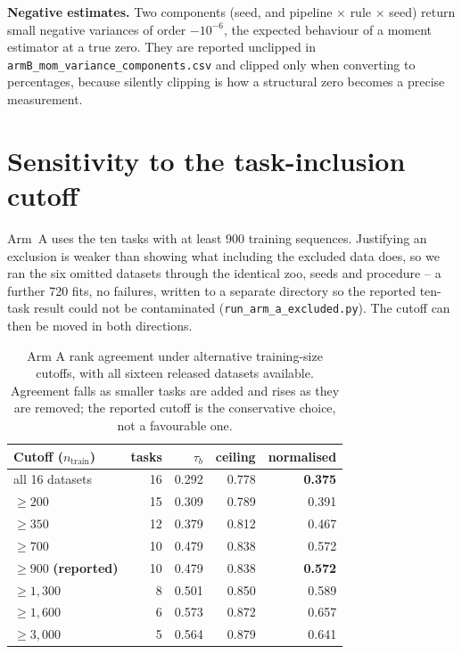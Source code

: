 \documentclass[11pt,a4paper]{article}
\begin{document}
\textbf{Negative estimates.} Two components (seed, and pipeline $\times$ rule $\times$ seed)
return small negative variances of order $-10^{-6}$, the expected behaviour of a moment
estimator at a true zero. They are reported unclipped in
\texttt{armB\_mom\_variance\_components.csv} and clipped only when converting to
percentages, because silently clipping is how a structural zero becomes a precise
measurement.

\section{Sensitivity to the task-inclusion cutoff}
\label{sec:cutoff}

Arm~A uses the ten tasks with at least 900 training sequences. Justifying an exclusion is
weaker than showing what including the excluded data does, so we ran the six omitted
datasets through the identical zoo, seeds and procedure -- a further 720 fits, no failures,
written to a separate directory so the reported ten-task result could not be contaminated
(\texttt{run\_arm\_a\_excluded.py}). The cutoff can then be moved in both directions.

\begin{table}[htbp]\centering\small
\caption{Arm A rank agreement under alternative training-size cutoffs, with all sixteen
released datasets available. Agreement falls as smaller tasks are added and rises as they
are removed; the reported cutoff is the conservative choice, not a favourable one.}
\label{tab:cutoff}
\begin{tabular}{lrrrr}
\toprule
Cutoff ($n_\text{train}$) & tasks & $\tau_b$ & ceiling & normalised \\
\midrule
all 16 datasets                & 16 & 0.292 & 0.778 & \textbf{0.375} \\
$\geq 200$                     & 15 & 0.309 & 0.789 & 0.391 \\
$\geq 350$                     & 12 & 0.379 & 0.812 & 0.467 \\
$\geq 700$                     & 10 & 0.479 & 0.838 & 0.572 \\
$\geq 900$ \textbf{(reported)} & 10 & 0.479 & 0.838 & \textbf{0.572} \\
$\geq 1{,}300$                 &  8 & 0.501 & 0.850 & 0.589 \\
$\geq 1{,}600$                 &  6 & 0.573 & 0.872 & 0.657 \\
$\geq 3{,}000$                 &  5 & 0.564 & 0.879 & 0.641 \\
\bottomrule
\end{tabular}
\end{table}
\end{document}
